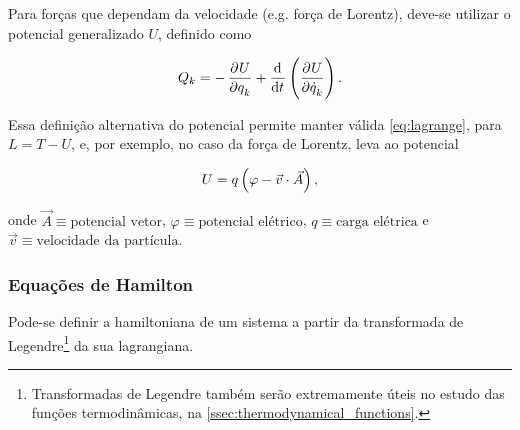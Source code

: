 Para forças que dependam da velocidade (e.g. força de Lorentz), deve-se utilizar
o potencial generalizado $U$, definido como

\begin{equation*}
    Q_k = - \dpd{U}{q_k} + \dod{}{t} \del{\dpd{U}{\dot q_k}} \text{.}
\end{equation*}

Essa definição alternativa do potencial permite manter válida
\autoref{eq:lagrange}, para $L = T - U$, e, por exemplo, no caso da força de
Lorentz, leva ao potencial

\begin{equation*}
    U = q \del{\varphi - {\vec v} \cdot {\vec A}} \text{,}
\end{equation*}

onde $\vec A \equiv \text{potencial vetor}$, $\varphi \equiv \text{potencial
elétrico}$, $q \equiv \text{carga elétrica}$ e $\vec v \equiv \text{velocidade
da partícula}$.

\subsubsection{Equações de Hamilton}

Pode-se definir a hamiltoniana de um sistema a partir da transformada de
Legendre\footnote{Transformadas de Legendre também serão extremamente úteis no
estudo das funções termodinâmicas, na \autoref{ssec:thermodynamical_functions}.}
da sua lagrangiana.


